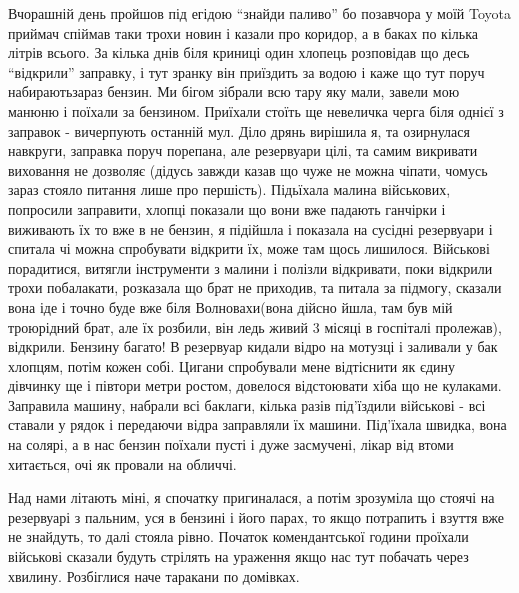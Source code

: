  
 
 
 
 

\qqSecCmt


Вчорашній день пройшов під егідою \enquote{знайди паливо} бо позавчора у моїй Toyota
приймач спіймав таки трохи новин і казали про коридор, а в баках по кілька
літрів всього. За кілька днів біля криниці один хлопець розповідав що десь
\enquote{відкрили} заправку, і тут зранку він приїздить за водою і каже що тут поруч
набираютьзараз бензин. Ми бігом зібрали всю тару яку мали, завели мою манюню і
поїхали за бензином. Приїхали стоїть ще невеличка черга біля однієї з заправок
- вичерпують останній мул. Діло дрянь вирішила я, та озирнулася навкруги,
заправка поруч порепана, але резервуари цілі, та самим викривати виховання не
дозволяє (дідусь завжди казав що чуже не можна чіпати, чомусь зараз стояло
питання лише про першість). Підьїхала малина військових, попросили заправити,
хлопці показали що вони вже падають ганчірки і виживають їх то вже в не бензин,
я підійшла і показала на сусідні резервуари і спитала чі можна спробувати
відкрити їх, може там щось лишилося. Військові порадитися, витягли інструменти
з малини і полізли відкривати, поки відкрили трохи побалакати, розказала що
брат не приходив, та питала за підмогу, сказали вона іде і точно буде вже біля
Волновахи(вона дійсно йшла, там був мій троюрідний брат, але їх розбили, він
ледь живий 3 місяці в госпіталі пролежав), відкрили. Бензину багато! В
резервуар кидали відро на мотузці і заливали у бак хлопцям, потім кожен собі.
Цигани спробували мене відтіснити як єдину дівчинку ще і півтори метри ростом,
довелося відстоювати хіба що не кулаками. Заправила машину, набрали всі
баклаги, кілька разів під’їздили військові - всі ставали у рядок і передаючи
відра заправляли їх машини. Під’їхала швидка, вона на солярі, а в нас бензин
поїхали пусті і дуже засмучені, лікар від втоми хитається, очі як провали на
обличчі.

Над нами літають міні, я спочатку пригиналася, а потім зрозуміла що стоячі на
резервуарі з пальним, уся в бензині і його парах, то якщо потрапить і взуття
вже не знайдуть, то далі стояла рівно. Початок комендантської години проїхали
військові сказали будуть стрілять на ураження якщо нас тут побачать через
хвилину. Розбіглися наче таракани по домівках.

